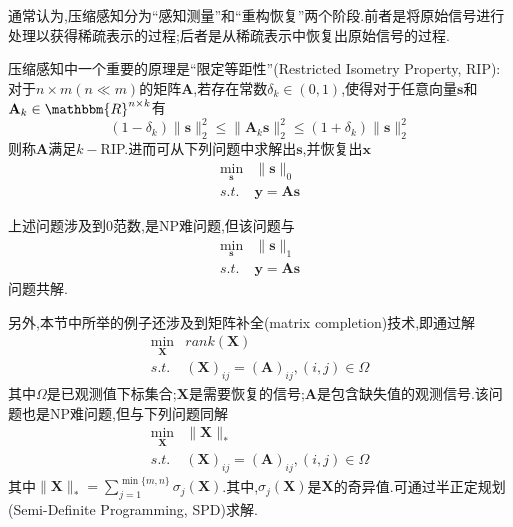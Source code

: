 通常认为,压缩感知分为``感知测量''和``重构恢复''两个阶段.前者是将原始信号进行处理以获得稀疏表示的过程;后者是从稀疏表示中恢复出原始信号的过程.

压缩感知中一个重要的原理是``限定等距性''(Restricted Isometry Property, RIP):对于$n\times m(n\ll m)$的矩阵$\mathbf{A}$,若存在常数$\delta_k\in(0,1)$,使得对于任意向量$\mathbf{s}$和$\mathbf{A}_k\in\mathbbm{R}^{n\times k}$有
\begin{equation}
(1-\delta_k)\|\mathbf{s}\|_2^2\le \|\mathbf{A}_k\mathbf{s}\|_2^2\le (1+\delta_k)\|\mathbf{s}\|_2^2
\end{equation}
则称$\mathbf{A}$满足$k-$RIP.进而可从下列问题中求解出$\mathbf{s}$,并恢复出$\mathbf{x}$
\begin{equation}
\begin{split}\min_{\mathbf{s}}&\|\mathbf{s}\|_0\\
s.t.& \mathbf{y=As}\end{split}
\end{equation}

上述问题涉及到$0$范数,是NP难问题,但该问题与
\begin{equation}
\begin{split}\min_{\mathbf{s}}&\|\mathbf{s}\|_1\\
s.t.& \mathbf{y=As}\end{split}
\end{equation}
问题共解.

另外,本节中所举的例子还涉及到矩阵补全(matrix completion)技术,即通过解
\begin{equation}
\begin{split}
\min_{\mathbf{X}}&rank(\mathbf{X})\\
s.t.&(\mathbf{X})_{ij}=(\mathbf{A})_{ij},(i,j)\in\Omega
\end{split}
\end{equation}
其中$\Omega$是已观测值下标集合;$\mathbf{X}$是需要恢复的信号;$\mathbf{A}$是包含缺失值的观测信号.该问题也是NP难问题,但与下列问题同解
\begin{equation}
\begin{split}
\min_{\mathbf{X}}&\|\mathbf{X}\|_{\ast}\\
s.t.&(\mathbf{X})_{ij}=(\mathbf{A})_{ij},(i,j)\in\Omega
\end{split}
\end{equation}
其中$\|\mathbf{X}\|_{\ast}=\sum_{j=1}^{\min\{m,n\}}\sigma_j(\mathbf{X})$.其中,$\sigma_j(\mathbf{X})$是$\mathbf{X}$的奇异值.可通过半正定规划(Semi-Definite Programming, SPD)求解.